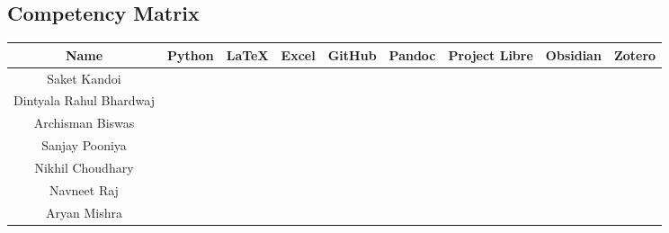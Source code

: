 \subsection{Competency Matrix}
\begin{center}
\label{table:competency}
\setlength\LTleft{-1.4cm}
\begin{longtable}{|c|c|c|c|c|c|p{1.2cm}|c|c|} \hline
Name                    & Python                   & LaTeX                    & Excel                    & GitHub                   & Pandoc                   & Project Libre            & Obsidian                 & Zotero                   \\ \hline
Saket Kandoi            & \cellcolor[HTML]{00B050} & \cellcolor[HTML]{92D050} & \cellcolor[HTML]{00B050} & \cellcolor[HTML]{00B050} & \cellcolor[HTML]{FFC000} & \cellcolor[HTML]{D9D9D9} & \cellcolor[HTML]{00B050} & \cellcolor[HTML]{FFC000} \\ \hline
Dintyala Rahul Bhardwaj & \cellcolor[HTML]{FFFF00} & \cellcolor[HTML]{00B050} & \cellcolor[HTML]{00B050} & \cellcolor[HTML]{FFFF00} & \cellcolor[HTML]{FFC000} & \cellcolor[HTML]{FFC000} & \cellcolor[HTML]{00B050} & \cellcolor[HTML]{FFC000} \\ \hline
Archisman Biswas        & \cellcolor[HTML]{00B050} & \cellcolor[HTML]{92D050} & \cellcolor[HTML]{92D050} & \cellcolor[HTML]{00B050} & \cellcolor[HTML]{FFFF00} & \cellcolor[HTML]{D9D9D9} & \cellcolor[HTML]{FFC000} & \cellcolor[HTML]{FFC000} \\ \hline
Sanjay Pooniya          & \cellcolor[HTML]{FFFF00} & \cellcolor[HTML]{92D050} & \cellcolor[HTML]{FFFF00} & \cellcolor[HTML]{92D050} & \cellcolor[HTML]{FFC000} & \cellcolor[HTML]{FFC000} & \cellcolor[HTML]{FFC000} & \cellcolor[HTML]{D9D9D9} \\ \hline
Nikhil Choudhary        & \cellcolor[HTML]{FFFF00} & \cellcolor[HTML]{92D050} & \cellcolor[HTML]{FFFF00} & \cellcolor[HTML]{FFFF00} & \cellcolor[HTML]{D9D9D9} & \cellcolor[HTML]{FFFF00} & \cellcolor[HTML]{FFC000} & \cellcolor[HTML]{00B050} \\ \hline
Navneet Raj             & \cellcolor[HTML]{00B050} & \cellcolor[HTML]{FFFF00} & \cellcolor[HTML]{FFFF00} & \cellcolor[HTML]{00B050} & \cellcolor[HTML]{FFFF00} & \cellcolor[HTML]{D9D9D9} & \cellcolor[HTML]{92D050} & \cellcolor[HTML]{D9D9D9} \\ \hline
Aryan Mishra            & \cellcolor[HTML]{92D050} & \cellcolor[HTML]{00B050} & \cellcolor[HTML]{92D050} & \cellcolor[HTML]{FFFF00} & \cellcolor[HTML]{FFFF00} & \cellcolor[HTML]{FFFF00} & \cellcolor[HTML]{00B050} & \cellcolor[HTML]{FFFF00} \\ \hline

\end{longtable}
\end{center}
